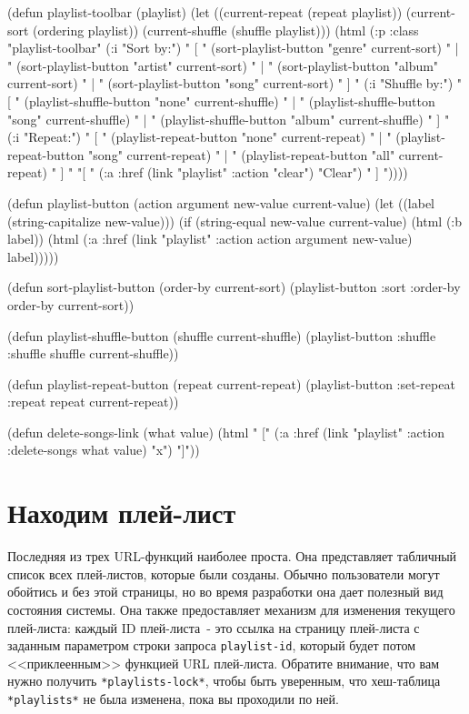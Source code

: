 \begin{myverb}
(defun playlist-toolbar (playlist)
  (let ((current-repeat (repeat playlist))
        (current-sort (ordering playlist))
        (current-shuffle (shuffle playlist)))
    (html
     (:p :class "playlist-toolbar"
         (:i "Sort by:")
         " [ "
         (sort-playlist-button "genre" current-sort) " | " 
         (sort-playlist-button "artist" current-sort) " | " 
         (sort-playlist-button "album" current-sort) " | " 
         (sort-playlist-button "song" current-sort) " ] "
         (:i "Shuffle by:")
         " [ "
         (playlist-shuffle-button "none" current-shuffle) " | "
         (playlist-shuffle-button "song" current-shuffle) " | "
         (playlist-shuffle-button "album" current-shuffle) " ] "
         (:i "Repeat:")
         " [ "
         (playlist-repeat-button "none" current-repeat) " | "
         (playlist-repeat-button "song" current-repeat) " | "
         (playlist-repeat-button "all" current-repeat) " ] "
         "[ " (:a :href (link "playlist" :action "clear") "Clear") " ] "))))

(defun playlist-button (action argument new-value current-value)
  (let ((label (string-capitalize new-value)))
    (if (string-equal new-value current-value)
      (html (:b label))
      (html (:a :href (link "playlist" :action action argument new-value) label)))))

(defun sort-playlist-button (order-by current-sort)
  (playlist-button :sort :order-by order-by current-sort))

(defun playlist-shuffle-button (shuffle current-shuffle)
  (playlist-button :shuffle :shuffle shuffle current-shuffle))

(defun playlist-repeat-button (repeat current-repeat)
  (playlist-button :set-repeat :repeat repeat current-repeat))

(defun delete-songs-link (what value)
  (html " [" (:a :href (link "playlist" :action :delete-songs what value) "x") "]"))
\end{myverb}

\section{Находим плей-лист}

Последняя из трех URL-функций наиболее проста. Она представляет табличный список всех
плей-листов, которые были созданы. Обычно пользователи могут обойтись и без этой страницы, но
во время разработки она дает полезный вид состояния системы. Она также предоставляет
механизм для изменения текущего плей-листа: каждый ID плей-листа~- это ссылка на страницу
плей-листа с заданным параметром строки запроса \lstinline{playlist-id}, который будет потом
<<приклеенным>> функцией URL плей-листа. Обратите внимание, что вам нужно получить
\lstinline{*playlists-lock*}, чтобы быть уверенным, что хеш-таблица \lstinline{*playlists*} не
была изменена, пока вы проходили по ней. 


